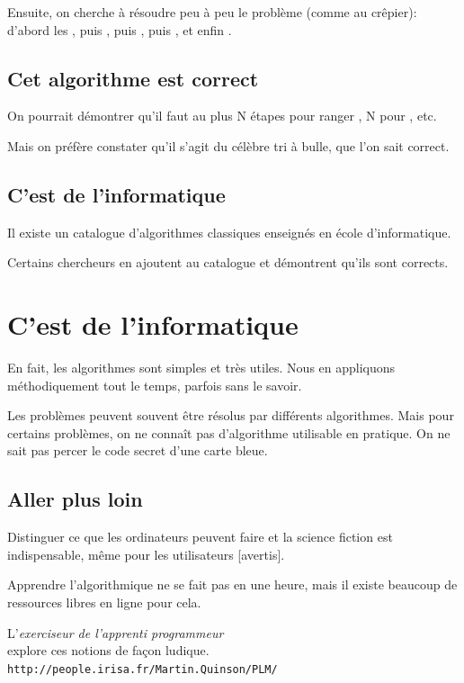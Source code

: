 \documentclass[a7paper,pagesize,DIV=14,10pt]{scrbook}
\begin{document}
Ensuite, on cherche à résoudre peu à peu le problème (comme au
crêpier): d'abord les , puis , puis ,
puis , et enfin .

\vspace{-.8\baselineskip}
\subsection*{Cet algorithme est correct}
\vspace{-.5\baselineskip}

On pourrait démontrer qu'il faut au plus N étapes pour ranger
, N pour , etc.

Mais on préfère constater qu'il s'agit du célèbre tri à bulle, que
l'on sait correct.

\vspace{-.8\baselineskip}
\subsection*{C'est de l'informatique}
\vspace{-.5\baselineskip}

Il existe un catalogue d'algorithmes classiques enseignés en école
d'informatique.

Certains chercheurs en ajoutent au catalogue et démontrent qu'ils
sont corrects.


\newpage
\section*{C'est de l'informatique}
\vspace{-.5\baselineskip} %
En fait, les algorithmes sont simples et très utiles. Nous en
appliquons méthodiquement tout le temps, parfois sans le savoir.

Les problèmes peuvent souvent être résolus par différents algorithmes.
Mais pour certains problèmes, on ne connaît pas d'algorithme
utilisable en pratique. On ne sait pas percer le code secret d'une
carte bleue.

\vspace{-.5\baselineskip} %
\subsection*{Aller plus loin}
\vspace{-.5\baselineskip} %
Distinguer ce que les ordinateurs peuvent faire et la science fiction
est indispensable, même pour les utilisateurs [avertis].

Apprendre l'algorithmique ne se fait pas en une heure, mais il existe
beaucoup de ressources libres en ligne pour cela.

L'\textit{exerciseur de l'apprenti programmeur}\\ explore
ces notions de façon ludique.\\
{\scriptsize\color{blue}\texttt{http://people.irisa.fr/Martin.Quinson/PLM/}}
\end{document}
